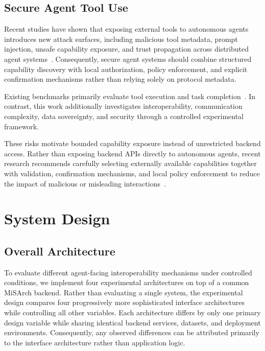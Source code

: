 \documentclass[conference]{IEEEtran}
\begin{document}
\subsection{Secure Agent Tool Use}

Recent studies have shown that exposing external tools to autonomous agents
introduces new attack surfaces, including malicious tool metadata, prompt
injection, unsafe capability exposure, and trust propagation across
distributed agent systems~\cite{ref5,ref6}. Consequently, secure agent
systems should combine structured capability discovery with local
authorization, policy enforcement, and explicit confirmation mechanisms
rather than relying solely on protocol metadata.

Existing benchmarks primarily evaluate tool execution and task
completion~\cite{ref7}. In contrast, this work additionally investigates
interoperability, communication complexity, data sovereignty, and security
through a controlled experimental framework.

These risks motivate bounded capability exposure instead of unrestricted
backend access. Rather than exposing backend APIs directly to autonomous
agents, recent research recommends carefully selecting externally available
capabilities together with validation, confirmation mechanisms, and local
policy enforcement to reduce the impact of malicious or misleading
interactions~\cite{ref5,ref6}.

\section{System Design}
\label{sec:design}

\subsection{Overall Architecture}

To evaluate different agent-facing interoperability mechanisms under
controlled conditions, we implement four experimental architectures on top
of a common MiSArch backend. Rather than evaluating a single system, the
experimental design compares four progressively more sophisticated interface
architectures while controlling all other variables. Each architecture
differs by only one primary design variable while sharing identical backend
services, datasets, and deployment environments. Consequently, any observed
differences can be attributed primarily to the interface architecture rather
than application logic.
\end{document}
